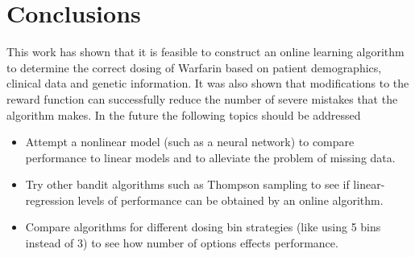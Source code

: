 \documentclass{article}
\begin{document}
\section{Conclusions}
\label{conclusions}

This work has shown that it is feasible to construct an online learning algorithm to determine the correct dosing of Warfarin based on patient demographics, clinical data and genetic information. It was also shown that modifications to the reward function can successfully reduce the number of severe mistakes that the algorithm makes. In the future the following topics should be addressed

\begin{itemize}
    \item Attempt a nonlinear model (such as a neural network) to compare performance to linear models and to alleviate the problem of missing data.
    \item Try other bandit algorithms such as Thompson sampling to see if linear-regression levels of performance can be obtained by an online algorithm.
    \item Compare algorithms for different dosing bin strategies (like using 5 bins instead of 3) to see how number of options effects performance.
\end{itemize}




\end{document}

